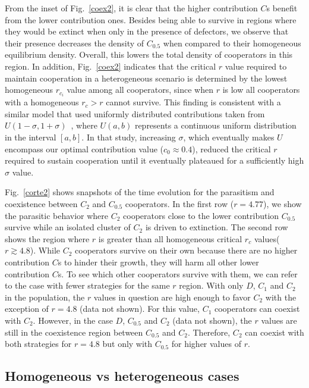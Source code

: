 \documentclass[twocolumn,aps,amsmath,pre,floatfix,superscriptaddress]{revtex4-2}
\begin{document}
From the inset of Fig.~\ref{coex2}, it is clear that the higher contribution $C$s benefit from  the lower contribution ones.  Besides being able to survive in regions where they would be extinct when only in the presence of defectors,  we observe that their presence decreases the density of  $C_{0.5}$ when compared to their homogeneous equilibrium density. Overall, this lowers the total density of cooperators in this region.
%
In addition, Fig.~\ref{coex2} indicates that the critical $r$ value required to maintain cooperation in a heterogeneous scenario is determined by the lowest homogeneous $r_{c_i}$ value among all cooperators, since when $r$ is low all cooperators with a homogeneous $r_c>r$ cannot survive. 
%
This finding is  consistent with a similar model that used uniformly distributed contributions taken from $U(1-\sigma,1+\sigma)$~\cite{huang2015effect}, where $U(a,b)$ represents a continuous uniform distribution in the interval $[a,b]$. In that study, increasing $\sigma$, which eventually makes $U$ encompass our optimal contribution value ($c_0\approx 0.4$), reduced the critical $r$ required to sustain cooperation until it eventually plateaued for a sufficiently high $\sigma$ value.

Fig.~\ref{corte2} shows snapshots of the time evolution for the parasitism and coexistence between $C_2$ and $C_{0.5}$ cooperators. In the first row ($r=4.77$), we show the parasitic behavior where $C_2$ cooperators close to the lower contribution $C_{0.5}$ survive while an isolated cluster of $C_2$ is driven to extinction. 
%
The second row shows the region where $r$ is greater than all homogeneous  critical $r_c$ values($r\gtrsim 4.8$). While $C_2$ cooperators survive on their own because there are no higher contribution $C$s to hinder their growth, they will harm all other lower contribution $C$s. 
%
To see which other cooperators survive with them, we can refer to the case with fewer strategies for the same $r$ region.  With only $D$, $C_1$ and $C_2$ in the population, the $r$ values in question are high enough to favor $C_2$ with the exception of $r=4.8$ (data not shown). For this value, $C_1$ cooperators can coexist with $C_2$.
%
However, in the case $D$, $C_{0.5}$ and $C_2$ (data not shown), the $r$ values are still in the coexistence region between $C_{0.5}$ and $C_2$.
%
Therefore, $C_2$ can coexist with both strategies for $r=4.8$ but only with $C_{0.5}$ for higher values of $r$.

% 
\subsection{Homogeneous vs heterogeneous cases}
\end{document}
